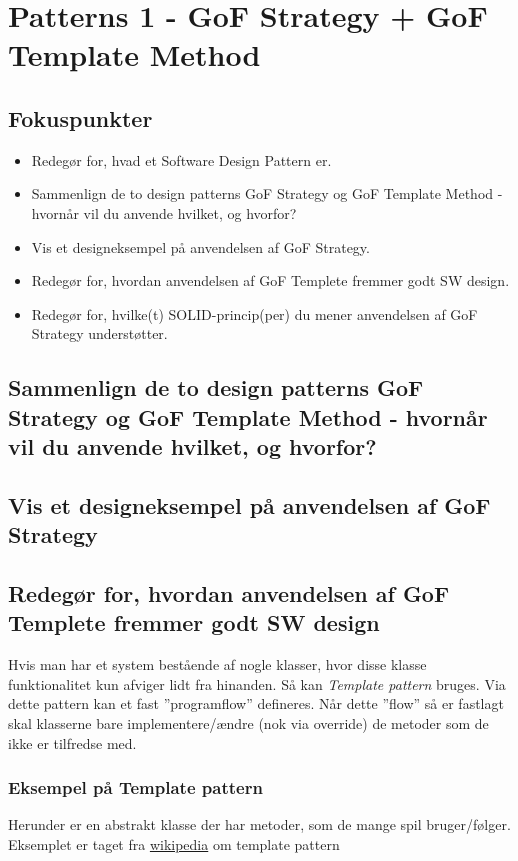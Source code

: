 \section{Patterns 1 - GoF Strategy + GoF Template Method}

\subsection{Fokuspunkter}

\begin{itemize}
	\item Redegør for, hvad et Software Design Pattern er.
	\item Sammenlign de to design patterns GoF Strategy og GoF Template Method - hvornår vil du anvende hvilket, og hvorfor?
	\item Vis et designeksempel på anvendelsen af GoF Strategy.
	\item Redegør for, hvordan anvendelsen af GoF Templete fremmer godt SW design.
	\item Redegør for, hvilke(t) SOLID-princip(per) du mener anvendelsen af GoF Strategy understøtter.
\end{itemize}



\subsection{Sammenlign de to design patterns GoF Strategy og GoF Template Method - hvornår vil du anvende hvilket, og hvorfor?}

\subsection{Vis et designeksempel på anvendelsen af GoF Strategy}

\subsection{Redegør for, hvordan anvendelsen af GoF Templete fremmer godt SW design}
Hvis man har et system bestående af nogle klasser, hvor disse klasse funktionalitet kun afviger lidt fra hinanden. Så kan \textit{Template pattern} bruges. Via dette pattern kan et fast ''programflow'' defineres. Når dette ''flow'' så er fastlagt skal klasserne bare implementere/ændre (nok via override) de metoder som de ikke er tilfredse med.

\subsubsection{Eksempel på Template pattern}
Herunder er en abstrakt klasse der har metoder, som de mange spil bruger/følger. Eksemplet er taget fra \href{https://en.wikipedia.org/wiki/Template_method_pattern#Example_in_Java}{wikipedia} om template pattern


